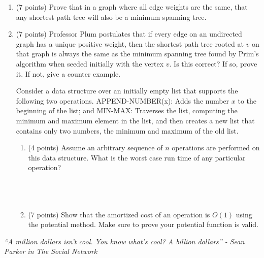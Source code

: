 \documentclass[11pt]{article}
\begin{document}
\begin{enumerate}
 
 
 
 \begin{enumerate}
 \item (7 points) Prove that in a graph where all edge weights are the same, that any shortest path tree will also be a minimum spanning tree.
 
  
\pagebreak
 
 \item (7 points) Professor Plum postulates that if every edge on an undirected graph has a unique positive weight, then the shortest path tree rooted at $v$ on that graph is always the same as the minimum spanning tree found by Prim's algorithm when seeded initially with the vertex $v$.  Is this correct?  If so, prove it.  If not, give a counter example.

\pagebreak

Consider a data structure over an initially empty list that supports the following two operations.  APPEND-NUMBER(x): Adds the number $x$ to the beginning of the list; and MIN-MAX: Traverses the list, computing the minimum and maximum element in the list, and then creates a new list that contains only two numbers, the minimum and maximum of the old list. 

\begin{enumerate}
\item (4 points) Assume an arbitrary sequence of $n$ operations are performed on this data structure.  What is the worst case run time of any particular operation? \ \\ \ \\ \ \\ \ \\
\item (7 points) Show that the amortized cost of an operation is $O(1)$ using the potential method.  Make sure to prove your potential function is valid.
\end{enumerate}
 
\end{enumerate}

 
 
 \emph{``A million dollars isn't cool.  You know what's cool?  A billion dollars'' - Sean Parker in The Social Network}
 

\end{enumerate}
\end{document}
